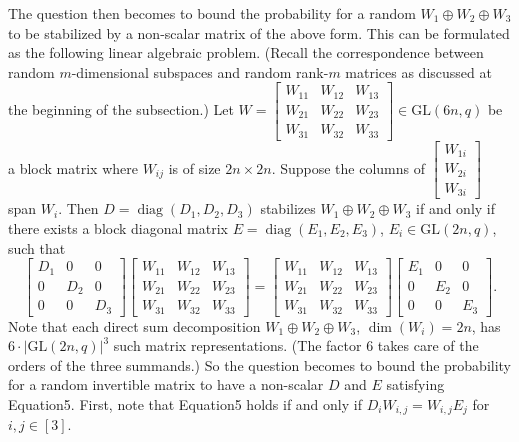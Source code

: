 The question then becomes to bound the probability for a random $W_1\oplus W_2\oplus W_3$ to be stabilized by a non-scalar matrix of the above form. This can be formulated as the following linear algebraic problem. (Recall the correspondence between random $m$-dimensional subspaces and random rank-$m$ matrices as discussed at the beginning of the subsection.) Let $W=\begin{bmatrix}W_{11}&W_{12}&W_{13}\\W_{21}&W_{22}&W_{23}\\W_{31}&W_{32}&W_{33}\end{bmatrix}\in\mathrm{GL}(6n,q)$ be a block matrix where $W_{ij}$ is of size $2n\times2n$. Suppose the columns of $\begin{bmatrix}W_{1i}\\W_{2i}\\W_{3i}\end{bmatrix}$ span $W_i$. Then $D=\operatorname{diag}(D_1,D_2,D_3)$ stabilizes $W_1\oplus W_2\oplus W_3$ if and only if there exists a block diagonal matrix $E=\operatorname{diag}(E_1,E_2,E_3)$, $E_i\in\mathrm{GL}(2n,q)$, such that
\begin{equation}\tag{5}
\begin{bmatrix}D_1&0&0\\0&D_2&0\\0&0&D_3\end{bmatrix}\begin{bmatrix}W_{11}&W_{12}&W_{13}\\W_{21}&W_{22}&W_{23}\\W_{31}&W_{32}&W_{33}\end{bmatrix}=\begin{bmatrix}W_{11}&W_{12}&W_{13}\\W_{21}&W_{22}&W_{23}\\W_{31}&W_{32}&W_{33}\end{bmatrix}\begin{bmatrix}E_1&0&0\\0&E_2&0\\0&0&E_3\end{bmatrix}.
\end{equation}
Note that each direct sum decomposition $W_1\oplus W_2\oplus W_3$, $\dim(W_i)=2n$, has $6\cdot|\mathrm{GL}(2n,q)|^3$ such matrix representations. (The factor 6 takes care of the orders of the three summands.) So the question becomes to bound the probability for a random invertible matrix to have a non-scalar $D$ and $E$ satisfying Equation5.
First, note that Equation5 holds if and only if $D_iW_{i,j}=W_{i,j}E_j$ for $i,j\in[3]$.
